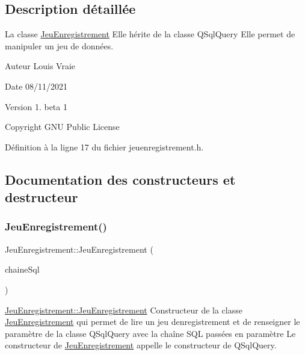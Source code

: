\subsection{Description détaillée}
La classe \hyperlink{class_jeu_enregistrement}{Jeu\+Enregistrement} Elle hérite de la classe Q\+Sql\+Query Elle permet de manipuler un jeu de données. 

\begin{DoxyAuthor}{Auteur}
Louis Vraie 
\end{DoxyAuthor}
\begin{DoxyDate}{Date}
08/11/2021 
\end{DoxyDate}
\begin{DoxyVersion}{Version}
1. beta 1 
\end{DoxyVersion}
\begin{DoxyCopyright}{Copyright}
G\+NU Public License 
\end{DoxyCopyright}


Définition à la ligne 17 du fichier jeuenregistrement.\+h.



\subsection{Documentation des constructeurs et destructeur}
\mbox{\label{class_jeu_enregistrement_ab7f4141f74961ae1d5060c6d19fae366}} 
\subsubsection{\texorpdfstring{Jeu\+Enregistrement()}{JeuEnregistrement()}}
{\footnotesize\ttfamily Jeu\+Enregistrement\+::\+Jeu\+Enregistrement (\begin{DoxyParamCaption}\item[{Q\+String}]{chaine\+Sql }\end{DoxyParamCaption})}



\hyperlink{class_jeu_enregistrement_ab7f4141f74961ae1d5060c6d19fae366}{Jeu\+Enregistrement\+::\+Jeu\+Enregistrement} Constructeur de la classe \hyperlink{class_jeu_enregistrement}{Jeu\+Enregistrement} qui permet de lire un jeu d\textquotesingle{}enregistrement et de renseigner le paramètre de la classe Q\+Sql\+Query avec la chaîne S\+QL passées en paramètre Le constructeur de \hyperlink{class_jeu_enregistrement}{Jeu\+Enregistrement} appelle le constructeur de Q\+Sql\+Query. 


